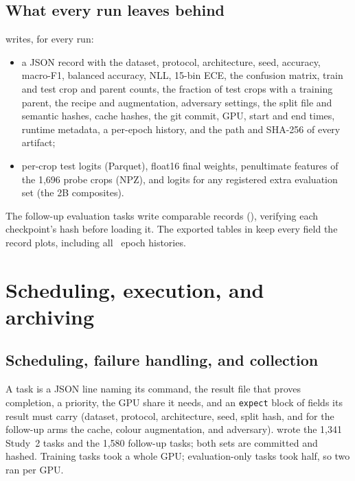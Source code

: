 \section{What every run leaves behind}
\label{r:ch:artifacts}

 writes, for every run:
\begin{itemize}[leftmargin=1.6em]
\item a JSON record with the dataset, protocol, architecture, seed, accuracy, macro-F1, balanced accuracy, NLL, 15-bin ECE,
the confusion matrix, train and test crop and parent counts, the fraction of test crops with a training parent, the
recipe and augmentation, adversary settings, the split file and semantic hashes, cache hashes, the git commit, GPU,
start and end times, runtime metadata, a per-epoch history, and the path and SHA-256 of every artifact;
\item per-crop test logits (Parquet), float16 final weights, penultimate features of the 1,696 probe crops (NPZ), and
logits for any registered extra evaluation set (the 2B composites).
\end{itemize}
The follow-up evaluation tasks write comparable records (), verifying each
checkpoint's hash before loading it. The exported tables in  keep every field the
record plots, including all \RecEpochs\ epoch histories.

\chapter{Scheduling, execution, and archiving}
\label{r:ch:scheduler}

\section{Scheduling, failure handling, and collection}



A task is a JSON line naming its command, the result file that proves completion, a priority, the GPU share it needs,
and an \texttt{expect} block of fields its result must carry (dataset, protocol, architecture, seed, split hash, and for
the follow-up arms the cache, colour augmentation, and adversary).  wrote the
1,341 Study~2 tasks and  the 1,580 follow-up tasks; both sets are
committed and hashed. Training tasks took a whole GPU; evaluation-only tasks took half, so two ran per GPU.

